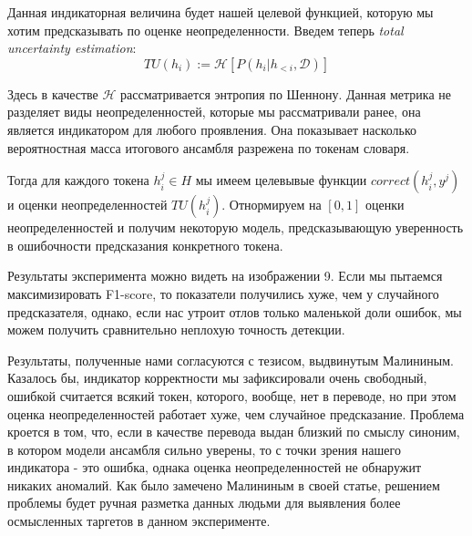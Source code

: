 \documentclass[a4paper,14pt]{extarticle}
\begin{document}
	Данная индикаторная величина будет нашей целевой функцией, которую мы хотим предсказывать по оценке неопределенности. Введем теперь \textit{total uncertainty estimation}:
	\begin{equation}
		TU(h_i) := \mathcal{H}[P(h_i|h_{<i}, \mathcal{D})]
	\end{equation}
	
	Здесь в качестве $\mathcal{H}$ рассматривается энтропия по Шеннону. Данная метрика не разделяет виды неопределенностей, которые мы рассматривали ранее, она является индикатором для любого проявления. Она показывает насколько вероятностная масса итогового ансамбля разрежена по токенам словаря.
	
	Тогда для каждого токена $h_i^j \in H$ мы имеем целевывые функции $correct(h_i^j, y^j)$ и оценки неопределенностей $TU(h_i^j)$. Отнормируем на $[0, 1]$ оценки неопределенностей и получим некоторую модель, предсказывающую уверенность в ошибочности предсказания конкретного токена.
	
	\begin{figure}[t]
	\end{figure}
	Результаты эксперимента можно видеть на изображении 9. Если мы пытаемся максимизировать F1-score, то показатели получились хуже, чем у случайного предсказателя, однако, если нас утроит отлов только маленькой доли ошибок, мы можем получить сравнительно неплохую точность детекции. 
	
	Результаты, полученные нами согласуются с тезисом, выдвинутым Малининым. Казалось бы, индикатор корректности мы зафиксировали очень свободный, ошибкой считается всякий токен, которого, вообще, нет в переводе, но при этом оценка неопределенностей работает хуже, чем случайное предсказание. Проблема кроется в том, что, если в качестве перевода выдан близкий по смыслу синоним, в котором модели ансамбля сильно уверены, то с точки зрения нашего индикатора - это ошибка, однака оценка неопределенностей не обнаружит никаких аномалий. Как было замечено Малининым в своей статье, решением проблемы будет ручная разметка данных людьми для выявления более осмысленных таргетов в данном эксперименте.
	
\end{document}
